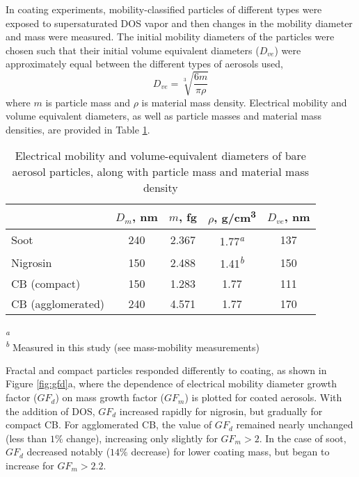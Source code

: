 In coating experiments, mobility-classified particles of different types were exposed to supersaturated DOS vapor and then changes in the mobility diameter and mass were measured. The initial mobility diameters of the particles were chosen such that their initial volume equivalent diameters ($D_{ve}$) were approximately equal between the different types of aerosols used,
\begin{equation}
    \label{eq:diam_ve}
    D_{ve}=\sqrt[3]{\frac{6m}{\pi\rho}}
\end{equation}
where $m$ is particle mass and $\rho$ is material mass density. Electrical mobility and volume equivalent diameters, as well as particle masses and material mass densities, are provided in Table \ref{tab:densities}.

\begin{table}[ht]
\caption{Electrical mobility and volume-equivalent diameters of bare aerosol particles, along with particle mass and material mass density}
\label{tab:densities}
\begin{center}
\begin{tabular}{ l c c c c } 
 \hline
 & $D_m$, nm & $m$, fg & $\rho$, g/cm\textsuperscript{3} & $D_{ve}$, nm\\
 \hline
Soot & 240 & 2.367 & 1.77\textsuperscript{\textit{a}} & 137\\
Nigrosin & 150 & 2.488 & 1.41\textsuperscript{\textit{b}} & 150\\
CB (compact) & 150 & 1.283 & 1.77 & 111\\
CB (agglomerated) & 240 & 4.571 & 1.77 & 170\\
 \hline
\end{tabular}
\end{center}

\textsuperscript{\textit{a}} \citet{park2004measurement}\\
\textsuperscript{\textit{b}} Measured in this study (see mass-mobility measurements)
\end{table}



Fractal and compact particles responded differently to coating, as shown in Figure \ref{fig:gfd}a, where the dependence of electrical mobility diameter growth factor ($GF_d$) on mass growth factor ($GF_{ m}$) is plotted for coated aerosols. With the addition of DOS, $GF_d$ increased rapidly for nigrosin, but gradually for compact CB. For agglomerated CB, the value of $GF_d$ remained nearly unchanged (less than $1 \%$ change), increasing only slightly for $GF_m > 2$. In the case of soot, $GF_d$ decreased notably ($14\%$ decrease) for lower coating mass, but began to increase for $GF_m > 2.2$.

